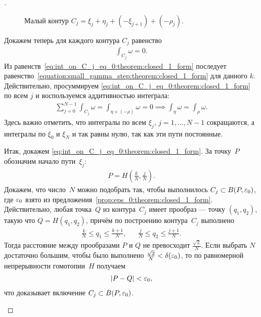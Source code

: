 \documentclass[../complex-analysis.tex]{subfiles}
\begin{document}
\begin{proof}[]
\begin{itemize}
   \begin{figure}[ht]
    \centering
    \caption{Малый контур $C_j = \xi_j+\eta_j + (-\xi_{j+1}) + (-\rho_j)$.}
    \label{fig:closed_1_form_small_contur}
   \end{figure}

   Докажем теперь для каждого контура $C_j$ равенство
   \begin{align}
    \label{eq:int_on_C_j_eq_0:theorem:closed_1_form}
    \int_{C_j} \omega = 0. 
   \end{align} Из равенств~\eqref{eq:int_on_C_j_eq_0:theorem:closed_1_form} последует равенство~\eqref{equation:small_gamma_step:theorem:closed_1_form} для данного $ k $. Действительно, просуммируем \eqref{eq:int_on_C_j_eq_0:theorem:closed_1_form} по всем $ j $ и воспользуемся аддитивностью интеграла:
   \begin{align*}
    \sum_{j=0}^{N-1} \int_{C_j} \omega = \int_{\eta + (-\rho)} \omega = 0 \implies \int_{\eta} \omega = \int_{\rho} \omega.  
   \end{align*} Здесь важно отметить, что интегралы по всем $ \xi_j $, $ j=1,\ldots,N-1 $ сокращаются, а интегралы по $ \xi_0 $ и $ \xi_N $ и так равны нулю, так как эти пути постоянные.

   Итак, докажем \eqref{eq:int_on_C_j_eq_0:theorem:closed_1_form}. За точку~$P$ обозначим начало пути~$\xi_j$:
   \begin{align*}
    P = H \left( \frac{k}{N}, \frac{j}{N} \right).
   \end{align*}Докажем, что число~$ N $ можно подобрать так, чтобы выполнилось $ C_j \subset B(P,\varepsilon_0) $, где $ \varepsilon_0 $ взято из предложения~\ref{prop:eps_0:theorem:closed_1_form}. Действительно, любая точка~$ Q $ из контура~$ C_j $ имеет прообраз --- точку $ (q_1, q_2) $, такую что  $ Q = H(q_1, q_2) $, причём по построению контура~$ C_j $ выполнено
   \begin{align*}
    \frac{k}{N} \leqslant q_1 \leqslant \frac{k+1}{N}, && \frac{j}{N} \leqslant q_2 \leqslant \frac{j+1}{N}.
   \end{align*} Тогда расстояние между прообразами $ P $ и $ Q $ не превосходит $ \frac{\sqrt 2}{N} $. Если выбрать $ N $ достаточно большим, чтобы было выполнено $ \frac{\sqrt 2}{N} < \delta(\varepsilon_0) $, то по равномерной непрерывности гомотопии~$ H $ получаем
   \begin{align*}
    \left| P - Q \right| < \varepsilon_0,
   \end{align*} что доказывает включение $C_j \subset B(P,\varepsilon_0)$.


\end{itemize}
\end{proof}
\end{document}

